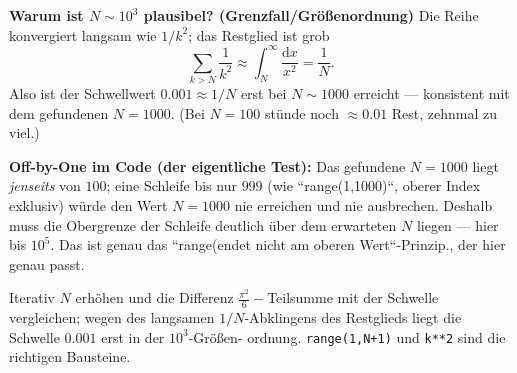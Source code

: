 \begin{kontrolle}
\textbf{Warum ist $N\sim10^3$ plausibel? (Grenzfall/Gr\"o\ss{}enordnung)}
Die Reihe konvergiert langsam wie $1/k^2$; das Restglied ist grob
\[
  \sum_{k>N}\frac1{k^2}\approx\int_N^\infty\frac{\mathrm dx}{x^2}
  =\frac1N .
\]
Also ist der Schwellwert $0.001\approx1/N$ erst bei $N\sim1000$
erreicht --- konsistent mit dem gefundenen $N=1000$. (Bei $N=100$ st\"unde
noch $\approx0.01$ Rest, zehnmal zu viel.)

\textbf{Off-by-One im Code (der eigentliche Test):} Das gefundene
$N=1000$ liegt \emph{jenseits} von $100$; eine Schleife bis nur $999$
(wie ``range(1,1000)``, oberer Index exklusiv) würde den Wert $N=1000$
nie erreichen und nie ausbrechen. Deshalb muss die Obergrenze der
Schleife deutlich über dem erwarteten $N$ liegen --- hier bis $10^5$.
Das ist genau das ``range(endet nicht am oberen Wert``-Prinzip., der hier
genau passt.
\end{kontrolle}

\begin{merksatz}
Iterativ $N$ erh\"ohen und die Differenz $\tfrac{\pi^2}6-$Teilsumme mit der
Schwelle vergleichen; wegen des langsamen $1/N$-Abklingens des
Restglieds liegt die Schwelle $0.001$ erst in der $10^3$-Gr\"o\ss{}en-
ordnung. \texttt{range(1,N+1)} und \texttt{k**2} sind die richtigen
Bausteine.
\end{merksatz}

